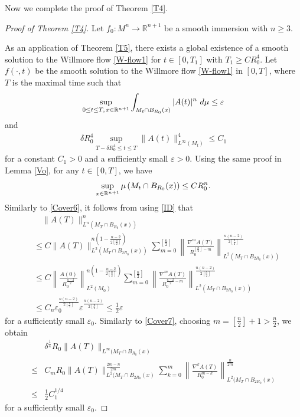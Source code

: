 \documentclass{amsart}
\theoremstyle{definition}
\def\R{{\Bbb R}}
\numberwithin{equation}{section}
\begin{document}
Now we complete the proof of Theorem   \ref{T4}.

 \begin{proof}[Proof of Theorem   \ref{T4}]
 Let $f_0: M^n \rightarrow \mathbb{R}^{n+1}$ be a smooth  immersion with $n\geq 3$.


As an application of Theorem  \ref{T5},   there exists a global existence of a smooth solution to the Willmore flow \eqref{W-flow1} for    $t\in [0, T_1]$ with $T_1\geq CR_0^4$. Let $f(\cdot, t)$ be the smooth solution  to the Willmore flow \eqref{W-flow1} in $[0,  T]$, where $T$ is the maximal time such that
\begin{align} \label{6M.0.1}\sup_{0 \leq t \leq T,\,
x\in\R^{n+1}} \int_{M_t\cap B_{R_0}(x)}   |A(t)|^{n}\  d\mu \leq \varepsilon
  \end{align}
   and
\begin{align} \label{6M.0.1.2}  \delta R_0^4  \sup_{T-\delta R_0^4\leq t\leq T}\|A(t)\|^4_{L^{\infty}(M_t)}   \leq C_1
  \end{align} for a  constant $C_1>0$ and a sufficiently small $\varepsilon >0$.
Using the same proof in Lemma \ref{Vo}, for any $t\in [ 0, T]$, we have
\begin{align}\label{6M.0.2}
\sup_{x\in \R^{n+1}}\mu \left ( M_t\cap B_{R_0}(x)\right )\leq CR_0^n.
\end{align}
Similarly to \eqref{Cover6},   it follows from using   \eqref {ID}  that
\begin{align*}
&\quad \|A (T)\|^n_{L^{n}(M_T\cap B_{R_0}(x))}\\
 &\leq C\| A (T)\|^{n(1-\frac {n-2}{2[\frac n2]})}_{L^2(M_T\cap B_{2R_0}(x))}\sum_{m=0}^{[\frac n2]}\left \|\frac {\nabla^{m}
A(T)}{R_0^{[\frac
n2] -m}}\right \|^{\frac {n(n-2)}{2[\frac n2]} }_{L^2(M_T\cap B_{2R_0}(x) )}\\
&\leq
C\left\| \frac {A (0)}{R_0^{\frac {n-2}2}}\right \|^{n(1-\frac {n-2}{2[\frac n2]})}_{L^2(M_0)}\sum_{m=0}^{[\frac n2]}\left \|\frac {\nabla^{m}
A(T)}{R_0^{\frac {n-2}2 -m} }\right \|^{\frac {n(n-2)}{2[\frac n2]} }_{L^2(M_T\cap B_{2R_0}(x) )}\\
&\leq C_n \varepsilon_0^{\frac {n(n-2)}{2[\frac n2]}}\varepsilon^{\frac {n(n-2)}{2[\frac n2]}}\leq \frac 12 \varepsilon \end{align*}
for a sufficiently small $\varepsilon_0$.  Similarly to \eqref{Cover7},  choosing $m=[\frac n2 ]+1> \frac n 2$, we obtain
  \begin{align}\label{6Cover7.1}
& \delta^{\frac 1 4} R_0\|A (T)\|_{L^{\infty}(M_T\cap B_{R_0}(x)}\\
\leq &C_mR_0\| A(T)\|^{\frac {2m-n}  {2m} }_{L^2(M_T\cap B_{2R_0}(x)}\sum_{k=0}^{ m}
\left \|\frac {\nabla^k A(T)}{R_0^{m -k}}\right \|^{\frac n
{2m}}_{L^2(M_T\cap B_{2R_0}(x) }\nonumber\\
\leq &\frac 1{2} C_1^{1/4}  \nonumber
\end{align}
for a sufficiently small $\varepsilon_0$.


\end{proof}
\end{document}
